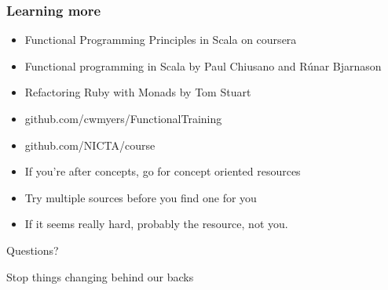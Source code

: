 \documentclass[aspectratio=169]{beamer}
\begin{document}
\begin{frame}
  \frametitle{Learning more}
  \begin{itemize}
    \item Functional Programming Principles in Scala on coursera
    \item Functional programming in Scala by Paul Chiusano and Rúnar Bjarnason
    \item Refactoring Ruby with Monads by Tom Stuart
    \item github.com/cwmyers/FunctionalTraining
    \item github.com/NICTA/course
    \item If you're after concepts, go for concept oriented resources
    \item Try multiple sources before you find one for you
    \item If it seems really hard, probably the resource, not you.
  \end{itemize}
\end{frame}

\begin{frame}
  \begin{center}
    \Huge Questions?
  \end{center}
\end{frame}

\begin{frame}
  \begin{center}
    \Huge Stop things changing behind our backs
  \end{center}
\end{frame}
\end{document}
